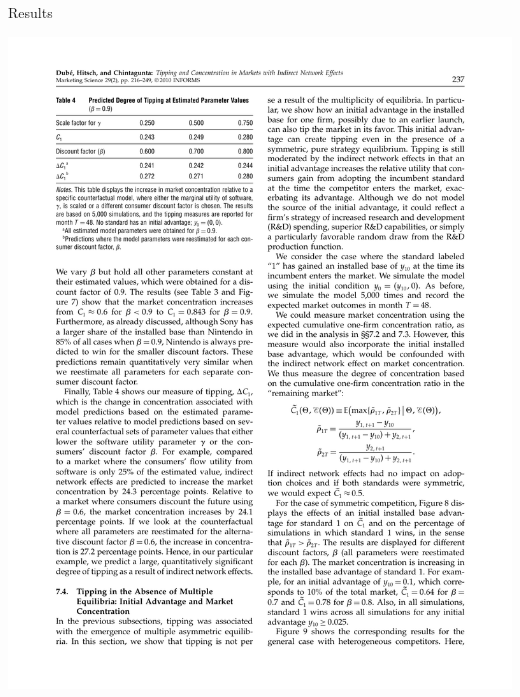 \documentclass[xcolor=pdftex,dvipsnames,table,mathserif]{beamer}
\begin{document}
\begin{frame}{Results}
\begin{center}
\includegraphics[scale=0.65]{resources/dube-table4}\\
\end{center}
\end{frame}
\end{document}
